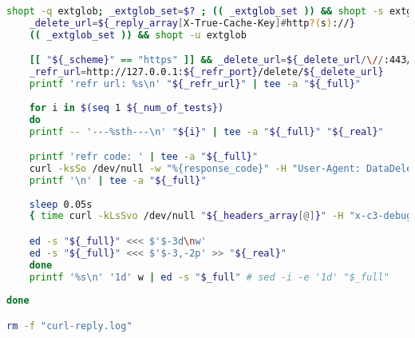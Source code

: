 \begin{appendices}
\begin{minipage}{0.8\linewidth}
\begin{lstlisting}[language=bash,caption={missTime Line by Line},label={py-misstime-line-by-line},basicstyle=\tiny\ttfamily,linewidth=\textwidth]
    shopt -q extglob; _extglob_set=$? ; (( _extglob_set )) && shopt -s extglob
    _delete_url=${_reply_array[X-True-Cache-Key]#http?(s)://}
    (( _extglob_set )) && shopt -u extglob

    [[ "${_scheme}" == "https" ]] && _delete_url=${_delete_url/\//:443/}
    _refr_url=http://127.0.0.1:${_refr_port}/delete/${_delete_url}
    printf 'refr url: %s\n' "${_refr_url}" | tee -a "${_full}"
    
    for i in $(seq 1 ${_num_of_tests})
    do
	printf -- '---%sth---\n' "${i}" | tee -a "${_full}" "${_real}"

	printf 'refr code: ' | tee -a "${_full}"
	curl -ksSo /dev/null -w "%{response_code}" -H "User-Agent: DataDelete" "${_refr_url}" | tee -a "${_full}"
	printf '\n' | tee -a "${_full}"
	
	sleep 0.05s
	{ time curl -kLsSvo /dev/null "${_headers_array[@]}" -H "x-c3-debug:enabled" --resolve "${_resolve}" "${_url}" 2>&1 | awk 'BEGIN {IGNORECASE=1}; /<[[:space:]].*[-_]cache:/ {print substr($0, 3) }' ; } 2>&1 | tee -a "${_full}"

	ed -s "${_full}" <<< $'$-3d\nw'
	ed -s "${_full}" <<< $'$-3,-2p' >> "${_real}"
    done
    printf '%s\n' '1d' w | ed -s "$_full" # sed -i -e '1d' "$_full"
    
done

rm -f "curl-reply.log"
\end{lstlisting}
\end{minipage}









\newpage{}
\listoffigures{}
\listoftables{}
\lstlistoflistings{}

\end{appendices}

